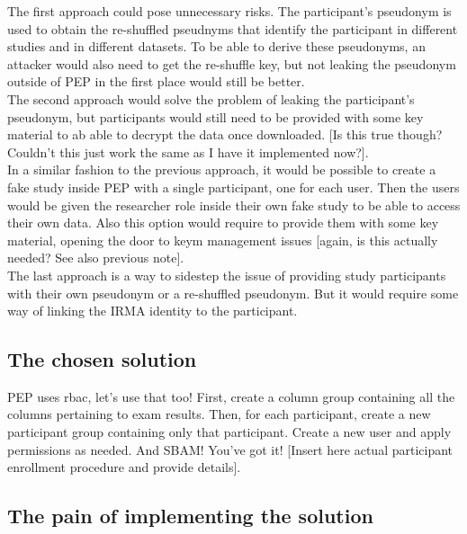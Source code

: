 \documentclass{report}
\begin{document}
The first approach could pose unnecessary risks. The participant's pseudonym is used to obtain the re-shuffled pseudnyms that identify the participant in different studies and in
different datasets. To be able to derive these pseudonyms, an attacker would also need to get the re-shuffle key, but not leaking the pseudonym outside of PEP in the first place would still be
better. \\
The second approach would solve the problem of leaking the participant's pseudonym, but participants would still need to be provided with some key material to ab able to decrypt
the data once downloaded. [Is this true though? Couldn't this just work the same as I have it implemented now?]. \\
In a similar fashion to the previous approach, it would be possible to create a fake study inside PEP with a single participant, one for each user. Then the users would be given
the researcher role inside their own fake study to be able to access their own data. Also this option would require to provide them with some key material, opening the door to keym
management issues [again, is this actually needed? See also previous note]. \\
The last approach is a way to sidestep the issue of providing study participants with their own pseudonym or a re-shuffled pseudonym. But it would require some way of linking the
IRMA identity to the participant.\\

\subsection{The chosen solution}
PEP uses rbac, let's use that too! First, create a column group containing all the columns pertaining to exam results. Then, for each participant, create a new participant group
containing only that participant. Create a new user and apply permissions as needed. And SBAM! You've got it! [Insert here actual participant enrollment procedure and provide
details].
\subsection{The pain of implementing the solution}

\fi

\printbibliography
\end{document}
